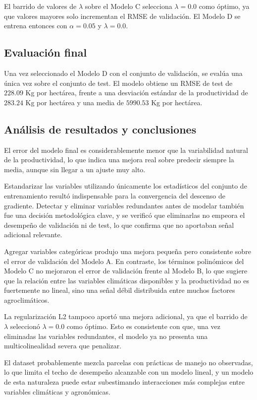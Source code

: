 \documentclass[journal]{IEEEtran}
\begin{document}
El barrido de valores de $\lambda$ sobre el Modelo C selecciona $\lambda=0.0$ como óptimo, ya que valores mayores solo incrementan el RMSE de validación. El Modelo D se entrena entonces con $\alpha=0.05$ y $\lambda=0.0$.

\subsection{Evaluación final}
Una vez seleccionado el Modelo D con el conjunto de validación, se evalúa una única vez sobre el conjunto de test. El modelo obtiene un RMSE de test de $228.09$ Kg por hectárea, frente a una desviación estándar de la productividad de $283.24$ Kg por hectárea y una media de $5990.53$ Kg por hectárea.

\subsection{Análisis de resultados y conclusiones}
El error del modelo final es considerablemente menor que la variabilidad natural de la productividad, lo que indica una mejora real sobre predecir siempre la media, aunque sin llegar a un ajuste muy alto.

Estandarizar las variables utilizando únicamente los estadísticos del conjunto de entrenamiento resultó indispensable para la convergencia del descenso de gradiente. Detectar y eliminar variables redundantes antes de modelar también fue una decisión metodológica clave, y se verificó que eliminarlas no empeora el desempeño de validación ni de test, lo que confirma que no aportaban señal adicional relevante.

Agregar variables categóricas produjo una mejora pequeña pero consistente sobre el error de validación del Modelo A. En contraste, los términos polinómicos del Modelo C no mejoraron el error de validación frente al Modelo B, lo que sugiere que la relación entre las variables climáticas disponibles y la productividad no es fuertemente no lineal, sino una señal débil distribuida entre muchos factores agroclimáticos.

La regularización L2 tampoco aportó una mejora adicional, ya que el barrido de $\lambda$ seleccionó $\lambda=0.0$ como óptimo. Esto es consistente con que, una vez eliminadas las variables redundantes, el modelo ya no presenta una multicolinealidad severa que penalizar.

El dataset probablemente mezcla parcelas con prácticas de manejo no observadas, lo que limita el techo de desempeño alcanzable con un modelo lineal, y un modelo de esta naturaleza puede estar subestimando interacciones más complejas entre variables climáticas y agronómicas.
\end{document}
